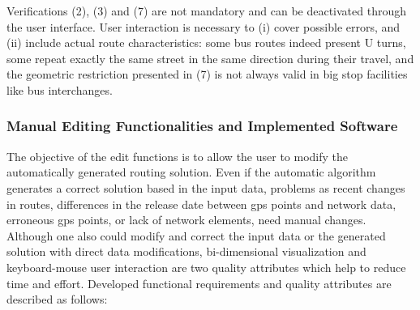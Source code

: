 Verifications (2), (3) and (7) are not mandatory and can be deactivated through the user interface. User interaction is necessary to (i) cover possible errors, and (ii) include actual route characteristics: some bus routes indeed present U turns, some repeat exactly the same street in the same direction during their travel, and the geometric restriction presented in (7) is not always valid in big stop facilities like bus interchanges.

\subsubsection{Manual Editing Functionalities and Implemented Software}
The objective of the edit functions is to allow the user to modify the automatically generated routing solution. Even if the automatic algorithm generates a correct solution based in the input data, problems as recent changes in routes, differences in the release date between \gls{gps} points and network data, erroneous \gls{gps} points, or lack of network elements, need manual changes. Although one also could modify and correct the input data or the generated solution with direct data modifications, bi-dimensional visualization and keyboard-mouse user interaction are two quality attributes which help to reduce time and effort. Developed functional requirements and quality attributes are described as follows:
%
